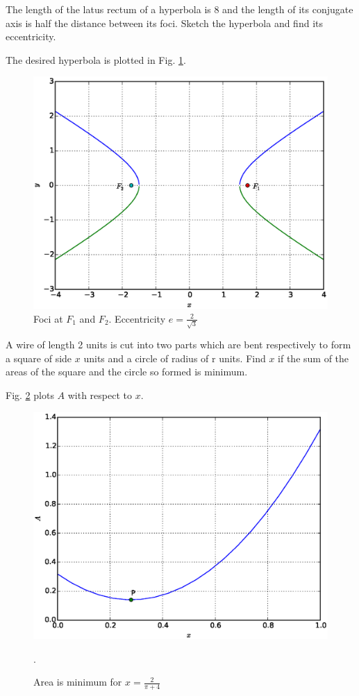 \documentclass[journal,12pt,twocolumn]{IEEEtran}
\begin{document}
\renewcommand{\thefigure}{\theproblem}
\begin{problem}
The length of the latus rectum of a hyperbola is 8 and the length of its conjugate axis is half the distance between its foci.  Sketch the hyperbola and find its eccentricity.
\end{problem}
\solution

The desired hyperbola is plotted in Fig. \ref{fig_38}.

%
\begin{figure}[h]
\centering
\includegraphics[width=\columnwidth]{./figs/ee16b1038}
\caption{ Foci at $F_1$ and $F_2$. Eccentricity $e = \frac{2}{\sqrt{3}}$}
\label{fig_38}	
\end{figure}
%
\begin{problem}
A wire of length 2 units is cut into two parts which are bent respectively to form a square of side $x$ units and a circle of radius of r units. Find $x$ if the sum of the areas of the square and the circle so formed is minimum.
\end{problem}
\solution

Fig. \ref{fig_39} plots $A$ with respect to $x$.

%
\begin{figure}[h]
\centering
\includegraphics[width=\columnwidth]{./figs/ee16b1039}
\caption{ Area is minimum for $x = \frac{2}{\pi + 4}$}.
\label{fig_39}	
\end{figure} 
\end{document}
